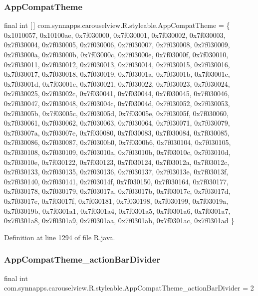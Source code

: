 \subsubsection{\texorpdfstring{AppCompatTheme}{AppCompatTheme}}
{\footnotesize\ttfamily final int \mbox{[}$\,$\mbox{]} com.\+synnapps.\+carouselview.\+R.\+styleable.\+App\+Compat\+Theme = \{ 0x1010057, 0x10100ae, 0x7f030000, 0x7f030001, 0x7f030002, 0x7f030003, 0x7f030004, 0x7f030005, 0x7f030006, 0x7f030007, 0x7f030008, 0x7f030009, 0x7f03000a, 0x7f03000b, 0x7f03000c, 0x7f03000e, 0x7f03000f, 0x7f030010, 0x7f030011, 0x7f030012, 0x7f030013, 0x7f030014, 0x7f030015, 0x7f030016, 0x7f030017, 0x7f030018, 0x7f030019, 0x7f03001a, 0x7f03001b, 0x7f03001c, 0x7f03001d, 0x7f03001e, 0x7f030021, 0x7f030022, 0x7f030023, 0x7f030024, 0x7f030025, 0x7f03002c, 0x7f030041, 0x7f030044, 0x7f030045, 0x7f030046, 0x7f030047, 0x7f030048, 0x7f03004c, 0x7f03004d, 0x7f030052, 0x7f030053, 0x7f03005b, 0x7f03005c, 0x7f03005d, 0x7f03005e, 0x7f03005f, 0x7f030060, 0x7f030061, 0x7f030062, 0x7f030063, 0x7f030064, 0x7f030071, 0x7f030079, 0x7f03007a, 0x7f03007e, 0x7f030080, 0x7f030083, 0x7f030084, 0x7f030085, 0x7f030086, 0x7f030087, 0x7f0300b0, 0x7f0300b6, 0x7f030104, 0x7f030105, 0x7f030108, 0x7f030109, 0x7f03010a, 0x7f03010b, 0x7f03010c, 0x7f03010d, 0x7f03010e, 0x7f030122, 0x7f030123, 0x7f030124, 0x7f03012a, 0x7f03012c, 0x7f030133, 0x7f030135, 0x7f030136, 0x7f030137, 0x7f03013e, 0x7f03013f, 0x7f030140, 0x7f030141, 0x7f03014f, 0x7f030150, 0x7f030164, 0x7f030177, 0x7f030178, 0x7f030179, 0x7f03017a, 0x7f03017b, 0x7f03017c, 0x7f03017d, 0x7f03017e, 0x7f03017f, 0x7f030181, 0x7f030198, 0x7f030199, 0x7f03019a, 0x7f03019b, 0x7f0301a1, 0x7f0301a4, 0x7f0301a5, 0x7f0301a6, 0x7f0301a7, 0x7f0301a8, 0x7f0301a9, 0x7f0301aa, 0x7f0301ab, 0x7f0301ac, 0x7f0301ad \}\hspace{0.3cm}{\ttfamily [static]}}



Definition at line 1294 of file R.\+java.

\mbox{\label{classcom_1_1synnapps_1_1carouselview_1_1_r_1_1styleable_a2d7a1490b540c76470da18fcbadf9c49}} 
\subsubsection{\texorpdfstring{AppCompatTheme\_actionBarDivider}{AppCompatTheme\_actionBarDivider}}
{\footnotesize\ttfamily final int com.\+synnapps.\+carouselview.\+R.\+styleable.\+App\+Compat\+Theme\+\_\+action\+Bar\+Divider = 2\hspace{0.3cm}{\ttfamily [static]}}



